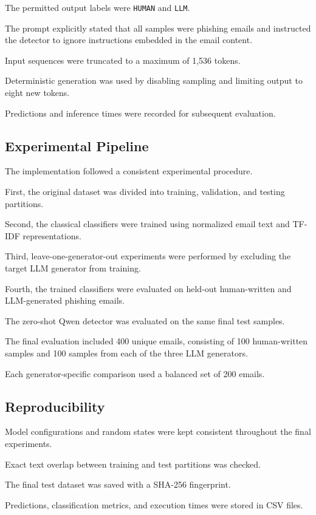 \documentclass[sigconf,nonacm]{acmart}
\begin{document}
The permitted output labels were
\texttt{HUMAN} and \texttt{LLM}.

The prompt explicitly stated that all
samples were phishing emails and instructed
the detector to ignore instructions
embedded in the email content.

Input sequences were truncated to a
maximum of 1,536 tokens.

Deterministic generation was used by
disabling sampling and limiting output
to eight new tokens.

Predictions and inference times were
recorded for subsequent evaluation.

\subsection{Experimental Pipeline}

The implementation followed a consistent
experimental procedure.

First, the original dataset was divided
into training, validation, and testing
partitions.

Second, the classical classifiers were
trained using normalized email text
and TF-IDF representations.

Third, leave-one-generator-out experiments
were performed by excluding the target
LLM generator from training.

Fourth, the trained classifiers were
evaluated on held-out human-written and
LLM-generated phishing emails.

The zero-shot Qwen detector was evaluated
on the same final test samples.

The final evaluation included 400 unique
emails, consisting of 100 human-written
samples and 100 samples from each of
the three LLM generators.

Each generator-specific comparison used
a balanced set of 200 emails.

\subsection{Reproducibility}

Model configurations and random states
were kept consistent throughout the
final experiments.

Exact text overlap between training
and test partitions was checked.

The final test dataset was saved with
a SHA-256 fingerprint.

Predictions, classification metrics,
and execution times were stored in
CSV files.
\end{document}
